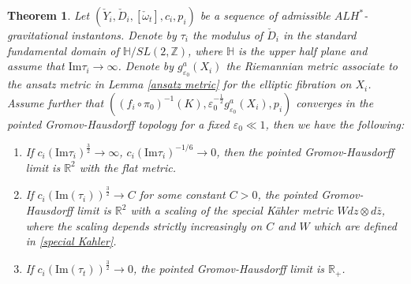 \documentclass[11pt]{amsart}
\theoremstyle{plain}
\newtheorem{thm}{Theorem}[section]
\theoremstyle{definition}
\numberwithin{equation}{section}
\renewcommand{\epsilon}{\varepsilon}
\begin{document}
 \begin{thm}\label{thm: compactify 1} Let $(\check{Y}_i,\check{D}_i,[\check{\omega}_t],c_i,p_i)$ be a sequence of admissible $ALH^*$-gravitational instantons.  Denote by $\tau_i$ the modulus of $\check{D}_i$ in the standard fundamental domain of $\mathbb{H}/SL(2,\mathbb{Z})$, where $\mathbb{H}$ is the upper half plane and assume that $\mbox{Im}\tau_i\rightarrow \infty$. Denote by $g^a_{\epsilon_0}(X_i)$ the Riemannian metric associate to the ansatz metric in Lemma \ref{ansatz metric} for the elliptic fibration on $X_i$. Assume further that $((f_i\circ \pi_0)^{-1}(K), \epsilon_0^{-\frac{1}{2}}g^a_{\epsilon_0}(X_i),p_i)$ converges in the pointed Gromov-Hausdorff topology for a fixed $\epsilon_0\ll 1$,
 	 then we have the following:
 	\begin{enumerate}
 			\item If $c_i(\mbox{Im}\tau_i)^{\frac{3}{2}}\rightarrow \infty$, $c_i(\mbox{Im}\tau_i)^{-1/6}\rightarrow 0$, then the pointed Gromov-Hausdorff limit is $\mathbb{R}^2$ with the flat metric.  
 		\item If $c_i(\mbox{Im}(\tau_i))^{\frac{3}{2}}\rightarrow C$ for some constant $C>0$, the pointed Gromov-Hausdorff limit is $\mathbb{R}^2$ with a scaling of the special K\"ahler metric $Wdz\otimes d\bar{z}$, where the scaling depends strictly increasingly on $C$ and $W$ which are defined in \eqref{special Kahler}. 
 		\item If $c_i(\mbox{Im}(\tau_t))^{\frac{3}{2}}\rightarrow 0$, the pointed Gromov-Hausdorff limit is $\mathbb{R}_+$.
 	\end{enumerate}
 \end{thm} 
\end{document}
